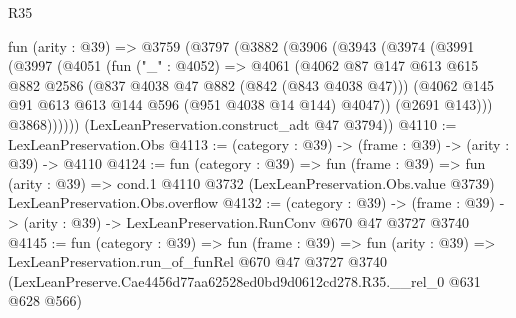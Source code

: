 \begin{lexlean}{R35}
\begin{coremodule}
  fun (arity : @39) =>
  @3759
    (@3797
      (@3882
        (@3906
          (@3943
            (@3974
              (@3991
                (@3997
                  (@4051
                    (fun ("_" : @4052) =>
                    @4061
                      (@4062
                        @87
                        @147
                        @613
                        @615
                        @882
                        @2586
                        (@837 @4038 @47 @882 (@842 (@843 @4038 @47)))
                        (@4062 @145 @91 @613 @613 @144 @596 (@951 @4038 @14 @144) @4047))
                      (@2691 @143)))
                  @3868))))))
      (LexLeanPreservation.construct_adt @47 @3794))
@4110 := LexLeanPreservation.Obs
@4113 := (category : @39) -> (frame : @39) -> (arity : @39) -> @4110
@4124 := fun (category : @39) =>
  fun (frame : @39) =>
  fun (arity : @39) =>
  cond.{1} @4110 @3732 (LexLeanPreservation.Obs.value @3739) LexLeanPreservation.Obs.overflow
@4132 := (category : @39) ->
  (frame : @39) -> (arity : @39) -> LexLeanPreservation.RunConv @670 @47 @3727 @3740
@4145 := fun (category : @39) =>
  fun (frame : @39) =>
  fun (arity : @39) =>
  LexLeanPreservation.run_of_funRel
    @670
    @47
    @3727
    @3740
    (LexLeanPreserve.Cae4456d77aa62528ed0bd9d0612cd278.R35.__rel_0 @631 @628 @566)
\end{coremodule}
\end{lexlean}
